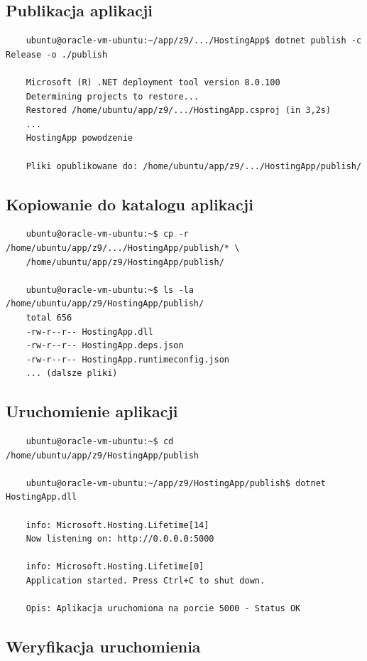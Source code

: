 \documentclass[twoside]{article}
\begin{document}
\subsection{Publikacja aplikacji}

\begin{verbatim}
	ubuntu@oracle-vm-ubuntu:~/app/z9/.../HostingApp$ dotnet publish -c Release -o ./publish
	
	Microsoft (R) .NET deployment tool version 8.0.100
	Determining projects to restore...
	Restored /home/ubuntu/app/z9/.../HostingApp.csproj (in 3,2s)
	...
	HostingApp powodzenie
	
	Pliki opublikowane do: /home/ubuntu/app/z9/.../HostingApp/publish/
\end{verbatim}

\subsection{Kopiowanie do katalogu aplikacji}

\begin{verbatim}
	ubuntu@oracle-vm-ubuntu:~$ cp -r /home/ubuntu/app/z9/.../HostingApp/publish/* \
	/home/ubuntu/app/z9/HostingApp/publish/
	
	ubuntu@oracle-vm-ubuntu:~$ ls -la /home/ubuntu/app/z9/HostingApp/publish/
	total 656
	-rw-r--r-- HostingApp.dll
	-rw-r--r-- HostingApp.deps.json
	-rw-r--r-- HostingApp.runtimeconfig.json
	... (dalsze pliki)
\end{verbatim}

\subsection{Uruchomienie aplikacji}

\begin{verbatim}
	ubuntu@oracle-vm-ubuntu:~$ cd /home/ubuntu/app/z9/HostingApp/publish
	
	ubuntu@oracle-vm-ubuntu:~/app/z9/HostingApp/publish$ dotnet HostingApp.dll
	
	info: Microsoft.Hosting.Lifetime[14]
	Now listening on: http://0.0.0.0:5000
	
	info: Microsoft.Hosting.Lifetime[0]
	Application started. Press Ctrl+C to shut down.
	
	Opis: Aplikacja uruchomiona na porcie 5000 - Status OK
\end{verbatim}

\subsection{Weryfikacja uruchomienia}
\end{document}
